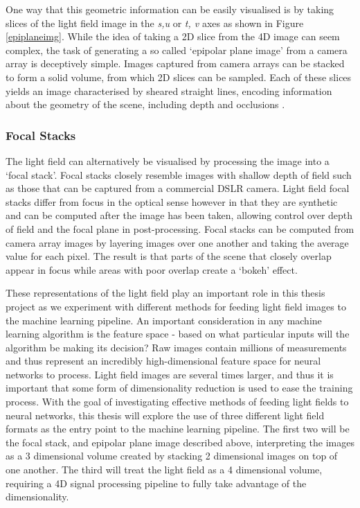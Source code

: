 One way that this geometric information can be easily visualised is by taking slices of the light field image in the \textit{s,u} or \textit{t, v} axes as shown in Figure \ref{epiplaneimg}. While the idea of taking a 2D slice from the 4D image can seem complex, the task of generating a so called `epipolar plane image' from a camera array is deceptively simple. Images captured from camera arrays can be stacked to form a solid volume, from which 2D slices can be sampled. Each of these slices yields an image characterised by sheared straight lines, encoding information about the geometry of the scene, including depth and occlusions \cite{bolles1987epiplane}. 


\subsubsection{Focal Stacks}
The light field can alternatively be visualised by processing the image into a `focal stack'. Focal stacks closely resemble images with shallow depth of field such as those that can be captured from a commercial DSLR camera. Light field focal stacks differ from focus in the optical sense however in that they are synthetic and can be computed after the image has been taken, allowing control over depth of field and the focal plane in post-processing. Focal stacks can be computed from camera array images by layering images over one another and taking the average value for each pixel. The result is that parts of the scene that closely overlap appear in focus while areas with poor overlap create a `bokeh' effect. 


These representations of the light field play an important role in this thesis project as we experiment with different methods for feeding light field images to the machine learning pipeline. An important consideration in any machine learning algorithm is the feature space - based on what particular inputs will the algorithm be making its decision? Raw images contain millions of measurements and thus represent an incredibly high-dimensional feature space for neural networks to process. Light field images are several times larger, and thus it is important that some form of dimensionality reduction is used to ease the training process. With the goal of investigating effective methods of feeding light fields to neural networks, this thesis will explore the use of three different light field formats as the entry point to the machine learning pipeline. The first two will be the focal stack, and epipolar plane image described above, interpreting the images as a 3 dimensional volume created by stacking 2 dimensional images on top of one another. The third will treat the light field as a 4 dimensional volume, requiring a 4D signal processing pipeline to fully take advantage of the dimensionality.


